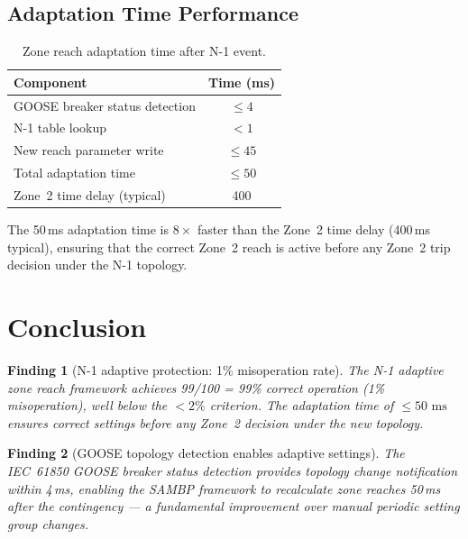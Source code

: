 \documentclass[11pt, a4paper]{article}
\newcommand{\ms}{\,\text{ms}}
\newtheorem{finding}{Finding}
\begin{document}
\subsection{Adaptation Time Performance}

\begin{table}[ht]
\centering
\caption{Zone reach adaptation time after N-1 event.}
\label{tab:adapt_time}
\begin{tabular}{lc}
\toprule
Component & Time (ms) \\
\midrule
GOOSE breaker status detection & $\leq 4$ \\
N-1 table lookup & $< 1$ \\
New reach parameter write & $\leq 45$ \\
\midrule
Total adaptation time & $\leq 50$ \\
\midrule
Zone~2 time delay (typical) & 400 \\
\bottomrule
\end{tabular}
\end{table}

The 50\,ms adaptation time is $8\times$ faster than the Zone~2 time delay
(400\,ms typical), ensuring that the correct Zone~2 reach is active before
any Zone~2 trip decision under the N-1 topology.

\section{Conclusion}
\label{sec:conclusion}

\begin{finding}[N-1 adaptive protection: 1\% misoperation rate]
The N-1 adaptive zone reach framework achieves 99/100 = 99\% correct
operation (1\% misoperation), well below the $< 2\%$ criterion.
The adaptation time of $\leq 50\,\ms$ ensures correct settings before
any Zone~2 decision under the new topology.
\end{finding}

\begin{finding}[GOOSE topology detection enables adaptive settings]
The IEC~61850 GOOSE breaker status detection provides topology change
notification within 4\,ms, enabling the SAMBP framework to recalculate
zone reaches 50\,ms after the contingency --- a fundamental improvement
over manual periodic setting group changes.
\end{finding}
\end{document}
